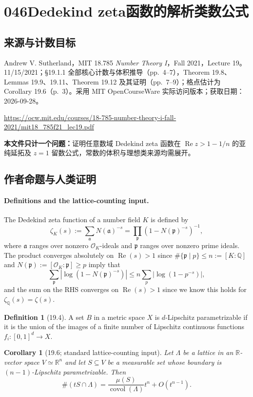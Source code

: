 \documentclass[UTF8,11pt]{ctexart}
\newtheorem*{corollary}{Corollary}
\theoremstyle{definition}
\newtheorem*{definition}{Definition}
\newcommand{\R}{\mathbb R}
\newcommand{\Q}{\mathbb Q}
\begin{document}
\section*{046\quad Dedekind zeta函数的解析类数公式}
\subsection*{来源与计数目标}
Andrew V. Sutherland，MIT 18.785 \emph{Number Theory I}，Fall 2021，Lecture 19。11/15/2021；\S19.1.1 全部核心计数与体积推导（pp.~4--7），Theorem 19.8、Lemmas 19.9、19.11、Theorem 19.12 及其证明（pp.~7--9）；格点估计为 Corollary 19.6（p.~3）。采用 MIT OpenCourseWare 实际访问版本；获取日期：2026-09-28。
\par\url{https://ocw.mit.edu/courses/18-785-number-theory-i-fall-2021/mit18_785f21_lec19.pdf}
\par\textbf{本文件只计一个问题：}证明任意数域 Dedekind zeta 函数在 $\operatorname{Re}z>1-1/n$ 的亚纯延拓及 $z=1$ 留数公式，常数的体积与理想类来源均需展开。
\subsection*{作者命题与人类证明}
\paragraph{Definitions and the lattice-counting input.}
The Dedekind zeta function of a number field $K$ is defined by
\[
\zeta_K(s):=\sum_{\mathfrak a}N(\mathfrak a)^{-s}
=\prod_{\mathfrak p}(1-N(\mathfrak p)^{-s})^{-1},
\]
where $\mathfrak a$ ranges over nonzero $\mathcal O_K$-ideals and $\mathfrak p$ ranges over nonzero prime ideals. The product converges absolutely on $\operatorname{Re}(s)>1$ since $\#\{\mathfrak p\mid p\}\leq n:=[K:\Q]$ and $N(\mathfrak p):=[\mathcal O_K:\mathfrak p]\geq p$ imply that
\[
\sum_{\mathfrak p}|\log(1-N(\mathfrak p)^{-s})|\leq n\sum_p|\log(1-p^{-s})|,
\]
and the sum on the RHS converges on $\operatorname{Re}(s)>1$ since we know this holds for $\zeta_\Q(s)=\zeta(s)$.
\begin{definition}[19.4]
A set $B$ in a metric space $X$ is $d$-Lipschitz parametrizable if it is the union of the images of a finite number of Lipschitz continuous functions $f_i:[0,1]^d\to X$.
\end{definition}
\begin{corollary}[19.6; standard lattice-counting input]
Let $\Lambda$ be a lattice in an $\R$-vector space $V\simeq\R^n$ and let $S\subseteq V$ be a measurable set whose boundary is $(n-1)$-Lipschitz parametrizable. Then
\[
\#(tS\cap\Lambda)=\frac{\mu(S)}{\operatorname{covol}(\Lambda)}t^n+O(t^{n-1}).
\]
\end{corollary}
\end{document}
